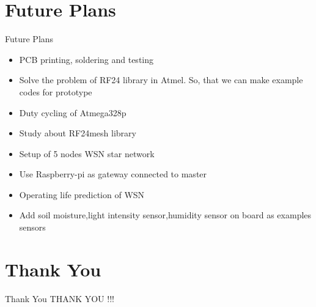 \documentclass[10pt, a4paper]{beamer}
\begin{document}
\section{Future Plans}
\begin{frame}{Future Plans}
	\begin{itemize}
		\item PCB printing, soldering and testing
        \item Solve the problem of RF24 library in Atmel. So, that we can make example codes for prototype
        \item Duty cycling of Atmega328p
        \item Study about RF24mesh library
        \item Setup of 5 nodes WSN star network
        \item Use Raspberry-pi as gateway connected to master
        \item Operating life prediction of WSN
        \item Add soil moisture,light intensity sensor,humidity sensor on board as examples sensors
	\end{itemize}
\end{frame}


\section{Thank You}
\begin{frame}{Thank You}
	\centering THANK YOU !!!
\end{frame}
\end{document}
